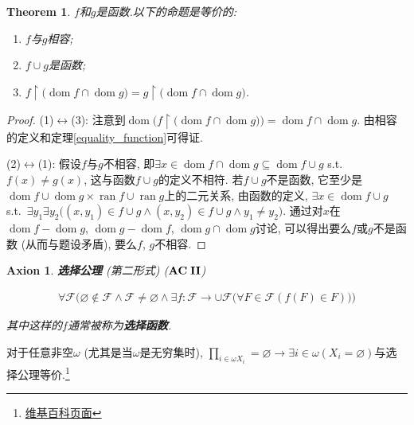 \documentclass[openany]{ctexbook}
\makeatletter
\newcommand*{\indexbf}[1]{\emph{\textbf{#1}}\index{#1}} %
\newcommand*{\indexfm}[2][ ]{#2\index{ 公式@笔记中出现的符号!#1@$#2$}} %
\theoremstyle{plain}
\newtheorem{axion}{Axion} %
\newtheorem{theorem}{Theorem}[section] %
\theoremstyle{definition}
\newcommand*{\properclass}[1]{\mathbf{#1}}
\DeclareMathOperator{\dom}{dom}
\DeclareMathOperator{\ran}{ran}
\makeatother
\begin{document}
\begin{theorem}\label{compatibility}
$f$和$g$是函数.以下的命题是等价的:
\begin{enumerate}[label=(\arabic*)]
\item $f$与$g$相容;
\item $f\cup g$是函数;
\item $f\upharpoonright \big(
	\dom f\cap \dom g\big) =
	g\upharpoonright \big(
	\dom f\cap \dom g\big)$.
\end{enumerate}

\end{theorem}
\begin{proof}
(1)$\leftrightarrow$(3): 注意到$\dom \Big(
	{f\upharpoonright \big(
		\dom f\cap \dom g\big)}\Big) = \dom f\cap \dom g$. 由相容的定义和定理\ref{equality_function}可得证.

(2)$\leftrightarrow$(1): 假设$f$与$g$不相容, 即$\exists x\in \dom f\cap \dom g\subseteq \dom{f\cup g}$ s.t.\ $f(x)\neq g(x)$, 这与函数$f\cup g$的定义不相符. 若$f\cup g$不是函数, 它至少是$\dom f\cup \dom g \times \ran f\cup \ran g$上的二元关系, 由函数的定义, $\exists x\in \dom{f\cup g}$ s.t.\ $\exists y_1\exists y_2\big(
	(x,y_1)\in f\cup g\wedge (x,y_2)\in f\cup g\wedge y_1\neq y_2\big)$. 通过对$x$在$\dom f - \dom g$, $\dom g - \dom f$, $\dom g\cap \dom g$讨论, 可以得出要么$f$或$g$不是函数 (从而与题设矛盾), 要么$f$, $g$不相容.
\end{proof}

\setcounter{axion}{8} %
\begin{axion}\label{AC2} \indexbf{选择公理} (第二形式) ($\indexfm[AC 2]{\properclass{AC\;II} }$)

\begin{align*}
	\forall \mathcal F\Big(
		\varnothing \notin \mathcal F\wedge 
			\mathcal F\neq \varnothing \wedge
				\exists f\colon \mathcal F\to \cup \mathcal F \big(
					\forall F\in \mathcal F(
						f(F)\in F)\big)\Big)
\end{align*}

其中这样的$f$通常被称为\indexbf{选择函数}.
\end{axion}

对于任意非空$\omega$ (尤其是当$\omega$是无穷集时), $\prod_{i\in \omega X_i} = \varnothing \to \exists i\in \omega ( X_i = \varnothing)$与选择公理等价.\footnote{\href{https://zh.wikipedia.org/wiki/\%E7\%AC\%9B\%E5\%8D\%A1\%E5\%84\%BF\%E7\%A7\%AF\#\%E6\%97\%A0\%E7\%A9\%B7\%E4\%B9\%98\%E7\%A7\%AF
	}{维基百科页面}}
\end{document}
